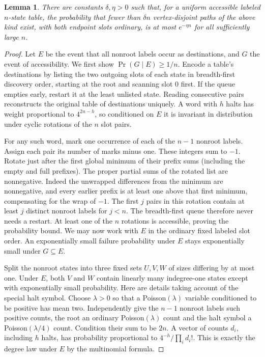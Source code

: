 \documentclass[11pt]{article}
\newtheorem{lemma}{Lemma}
\begin{document}
\begin{lemma}\label{many}
There are constants $\delta,\eta>0$ such that, for a uniform accessible labeled $n$-state table, the probability that fewer than $\delta n$ vertex-disjoint paths of the above kind exist, with both endpoint slots ordinary, is at most $e^{-\eta n}$ for all sufficiently large $n$.
\end{lemma}

\begin{proof}
Let $E$ be the event that all nonroot labels occur as destinations, and $G$ the event of accessibility. We first show $\Pr(G\mid E)\ge1/n$. Encode a table's destinations by listing the two outgoing slots of each state in breadth-first discovery order, starting at the root and scanning slot 0 first. If the queue empties early, restart it at the least unlisted state. Reading consecutive pairs reconstructs the original table of destinations uniquely. A word with $h$ halts has weight proportional to $4^{2n-h}$, so conditioned on $E$ it is invariant in distribution under cyclic rotations of the $n$ slot pairs.

For any such word, mark one occurrence of each of the $n-1$ nonroot labels. Assign each pair its number of marks minus one. These integers sum to $-1$. Rotate just after the first global minimum of their prefix sums (including the empty and full prefixes). The proper partial sums of the rotated list are nonnegative. Indeed the unwrapped differences from the minimum are nonnegative, and every earlier prefix is at least one above that first minimum, compensating for the wrap of $-1$. The first $j$ pairs in this rotation contain at least $j$ distinct nonroot labels for $j<n$. The breadth-first queue therefore never needs a restart. At least one of the $n$ rotations is accessible, proving the probability bound. We may now work with $E$ in the ordinary fixed labeled slot order. An exponentially small failure probability under $E$ stays exponentially small under $G\subseteq E$.

Split the nonroot states into three fixed sets $U,V,W$ of sizes differing by at most one. Under $E$, both $V$ and $W$ contain linearly many indegree-one states except with exponentially small probability. Here are details taking account of the special halt symbol. Choose $\lambda>0$ so that a Poisson$(\lambda)$ variable conditioned to be positive has mean two. Independently give the $n-1$ nonroot labels such positive counts, the root an ordinary Poisson$(\lambda)$ count and the halt symbol a Poisson$(\lambda/4)$ count. Condition their sum to be $2n$. A vector of counts $d_i$, including $h$ halts, has probability proportional to $4^{-h}/\prod_i d_i!$. This is exactly the degree law under $E$ by the multinomial formula.


\end{proof}
\end{document}
